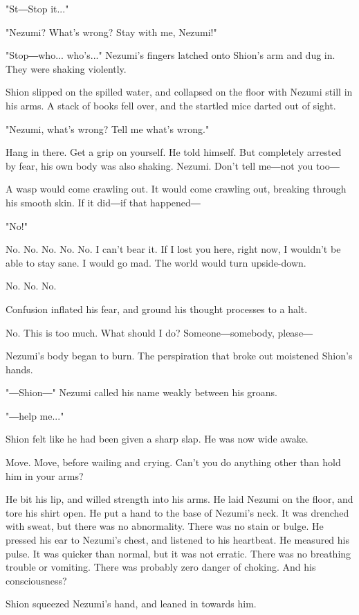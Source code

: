 "St―Stop it..."

"Nezumi? What's wrong? Stay with me, Nezumi!"

"Stop―who... who's..." Nezumi's fingers latched onto Shion's arm and dug
in. They were shaking violently.

Shion slipped on the spilled water, and collapsed on the floor with
Nezumi still in his arms. A stack of books fell over, and the startled
mice darted out of sight.

"Nezumi, what's wrong? Tell me what's wrong."

Hang in there. Get a grip on yourself. He told himself. But completely
arrested by fear, his own body was also shaking. Nezumi. Don't tell
me―not you too―

A wasp would come crawling out. It would come crawling out, breaking
through his smooth skin. If it did―if that happened―

"No!"

No. No. No. No. No. I can't bear it. If I lost you here, right now, I
wouldn't be able to stay sane. I would go mad. The world would turn
upside-down.

No. No. No.

Confusion inflated his fear, and ground his thought processes to a halt.

No. This is too much. What should I do? Someone―somebody, please―

Nezumi's body began to burn. The perspiration that broke out moistened
Shion's hands.

"―Shion―" Nezumi called his name weakly between his groans.

"―help me..."

Shion felt like he had been given a sharp slap. He was now wide awake.

Move. Move, before wailing and crying. Can't you do anything other than
hold him in your arms?

He bit his lip, and willed strength into his arms. He laid Nezumi on the
floor, and tore his shirt open. He put a hand to the base of Nezumi's
neck. It was drenched with sweat, but there was no abnormality. There
was no stain or bulge. He pressed his ear to Nezumi's chest, and
listened to his heartbeat. He measured his pulse. It was quicker than
normal, but it was not erratic. There was no breathing trouble or
vomiting. There was probably zero danger of choking. And his
consciousness?

Shion squeezed Nezumi's hand, and leaned in towards him.

